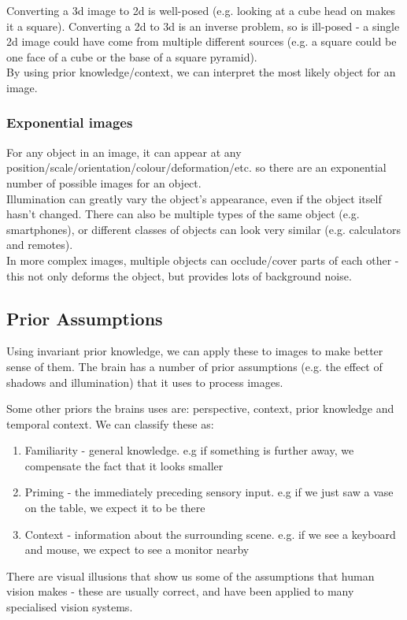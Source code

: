 Converting a 3d image to 2d is well-posed (e.g. looking at a cube head on makes it a square). Converting a 2d to 3d is an inverse problem, so is ill-posed - a single 2d image could have come from multiple different sources (e.g. a square could be one face of a cube or the base of a square pyramid).\\

By using prior knowledge/context, we can interpret the most likely object for an image.

\subsubsection{Exponential images}
For any object in an image, it can appear at any position/scale/orientation/colour/deformation/etc. so there are an exponential number of possible images for an object.\\
Illumination can greatly vary the object's appearance, even if the object itself hasn't changed. There can also be multiple types of the same object (e.g. smartphones), or different classes of objects can look very similar (e.g. calculators and remotes).\\
In more complex images, multiple objects can occlude/cover parts of each other - this not only deforms the object, but provides lots of background noise. 

\subsection{Prior Assumptions}
Using invariant prior knowledge, we can apply these to images to make better sense of them. The brain has a number of prior assumptions (e.g. the effect of shadows and illumination) that it uses to process images. 

Some other priors the brains uses are: perspective, context, prior knowledge and temporal context. We can classify these as:
\begin{enumerate}
    \item Familiarity - general knowledge. e.g if something is further away, we compensate the fact that it looks smaller
    \item Priming - the immediately preceding sensory input. e.g if we just saw a vase on the table, we expect it to be there
    \item Context - information about the surrounding scene. e.g. if we see a keyboard and mouse, we expect to see a monitor nearby
\end{enumerate}
There are visual illusions that show us some of the assumptions that human vision makes - these are usually correct, and have been applied to many specialised vision systems. 